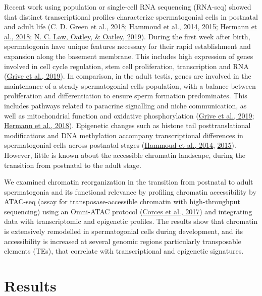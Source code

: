 \documentclass[12pt,twoside]{reedthesis}
\begin{document}
Recent work using population or single-cell RNA sequencing (RNA-seq)
showed that distinct transcriptional profiles characterize
spermatogonial cells in postnatal and adult life (\protect\hyperlink{ref-green2018}{C. D. Green et al., 2018}; \protect\hyperlink{ref-hammoud2014}{Hammoud et al., 2014}, \protect\hyperlink{ref-hammoud2015}{2015}; \protect\hyperlink{ref-hermann2018}{Hermann et al., 2018}; \protect\hyperlink{ref-law2019}{N. C. Law, Oatley, \& Oatley, 2019}). During the first week
after birth, spermatogonia have unique features necessary for their
rapid establishment and expansion along the basement membrane. This
includes high expression of genes involved in cell cycle regulation,
stem cell proliferation, transcription and RNA (\protect\hyperlink{ref-grive2019}{Grive et al., 2019}). In
comparison, in the adult testis, genes are involved in the maintenance
of a steady spermatogonial cells population, with a balance between
proliferation and differentiation to ensure sperm formation
predominates. This includes pathways related to paracrine signalling and
niche communication, as well as mitochondrial function and oxidative
phosphorylation (\protect\hyperlink{ref-grive2019}{Grive et al., 2019}; \protect\hyperlink{ref-hermann2018}{Hermann et al., 2018}). Epigenetic changes such as
histone tail posttranslational modifications and DNA methylation
accompany transcriptional differences in spermatogonial cells across
postnatal stages (\protect\hyperlink{ref-hammoud2014}{Hammoud et al., 2014}, \protect\hyperlink{ref-hammoud2015}{2015}). However, little is known
about the accessible chromatin landscape, during the transition from
postnatal to the adult stage.

We examined chromatin reorganization in the transition from postnatal to
adult spermatogonia and its functional relevance by profiling chromatin
accessibility by ATAC-seq (assay for transposase-accessible chromatin
with high-throughput sequencing) using an Omni-ATAC protocol
(\protect\hyperlink{ref-corces2017}{Corces et al., 2017}) and integrating data with transcriptomic and epigenetic
profiles. The results show that chromatin is extensively remodelled in
spermatogonial cells during development, and its accessibility is
increased at several genomic regions particularly transposable elements
(TEs), that correlate with transcriptional and epigenetic signatures.

\hypertarget{results}{%
\section{Results}\label{results}}
\end{document}
